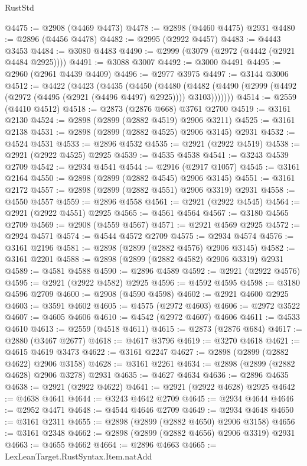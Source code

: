 \begin{lexlean}{RustStd}
\begin{coremodule}
@4475 := @2908 (@4469 @4473)
@4478 := @2898 (@4460 @4475) @2931
@4480 := @2896 (@4456 @4478)
@4482 := @2995 (@2922 @4457)
@4483 := @4443 @3453
@4484 := @3080 @4483
@4490 := @2999 (@3079 (@2972 (@4442 (@2921 @4484 @2925))))
@4491 := @3088 @3007
@4492 := @3000 @4491
@4495 := @2960 (@2961 @4439 @4409)
@4496 := @2977 @3975
@4497 := @3144 @3006
@4512 := @4422
    (@4423
      (@4435
        (@4450
          (@4480
            (@4482 (@4490 (@2999 (@4492 (@2972 (@4495 (@2921 (@4496 @4497) @2925)))) @3103)))))))
@4514 := @2559 (@4410 @4512)
@4518 := @2873 (@2876 @668) @3761 @2700
@4519 := @3161 @2130
@4524 := @2898 (@2899 (@2882 @4519) @2906 @3211)
@4525 := @3161 @2138
@4531 := @2898 (@2899 (@2882 @4525) @2906 @3145) @2931
@4532 := @4524 @4531
@4533 := @2896 @4532
@4535 := @2921 (@2922 @4519)
@4538 := @2921 (@2922 @4525) @2925
@4539 := @4535 @4538
@4541 := @3243 @4539 @2709
@4542 := @2934 @4541
@4544 := @2916 (@2917 @1057)
@4545 := @3161 @2164
@4550 := @2898 (@2899 (@2882 @4545) @2906 @3145)
@4551 := @3161 @2172
@4557 := @2898 (@2899 (@2882 @4551) @2906 @3319) @2931
@4558 := @4550 @4557
@4559 := @2896 @4558
@4561 := @2921 (@2922 @4545)
@4564 := @2921 (@2922 @4551) @2925
@4565 := @4561 @4564
@4567 := @3180 @4565 @2709
@4569 := @2908 (@4559 @4567)
@4571 := @2921 @4569 @2925
@4572 := @2924 @4571
@4574 := @4544 @4572 @2709
@4575 := @2934 @4574
@4576 := @3161 @2196
@4581 := @2898 (@2899 (@2882 @4576) @2906 @3145)
@4582 := @3161 @2201
@4588 := @2898 (@2899 (@2882 @4582) @2906 @3319) @2931
@4589 := @4581 @4588
@4590 := @2896 @4589
@4592 := @2921 (@2922 @4576)
@4595 := @2921 (@2922 @4582) @2925
@4596 := @4592 @4595
@4598 := @3180 @4596 @2709
@4600 := @2908 (@4590 @4598)
@4602 := @2921 @4600 @2925
@4603 := @3591 @4602
@4605 := @4575 (@2972 @4603)
@4606 := @2972 @3522
@4607 := @4605 @4606
@4610 := @4542 (@2972 @4607) @4606
@4611 := @4533 @4610
@4613 := @2559 (@4518 @4611)
@4615 := @2873 (@2876 @684)
@4617 := @2880 (@3467 @2677)
@4618 := @4617 @3796
@4619 := @3270 @4618
@4621 := @4615 @4619 @3473
@4622 := @3161 @2247
@4627 := @2898 (@2899 (@2882 @4622) @2906 @3158)
@4628 := @3161 @2261
@4634 := @2898 (@2899 (@2882 @4628) @2906 @3278) @2931
@4635 := @4627 @4634
@4636 := @2896 @4635
@4638 := @2921 (@2922 @4622)
@4641 := @2921 (@2922 @4628) @2925
@4642 := @4638 @4641
@4644 := @3243 @4642 @2709
@4645 := @2934 @4644
@4646 := @2952 @4471
@4648 := @4544 @4646 @2709
@4649 := @2934 @4648
@4650 := @3161 @2311
@4655 := @2898 (@2899 (@2882 @4650) @2906 @3158)
@4656 := @3161 @2348
@4662 := @2898 (@2899 (@2882 @4656) @2906 @3319) @2931
@4663 := @4655 @4662
@4664 := @2896 @4663
@4665 := LexLeanTarget.RustSyntax.Item.natAdd

\end{coremodule}
\end{lexlean}
